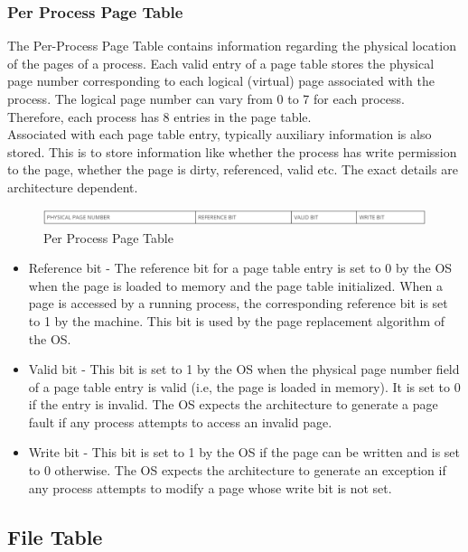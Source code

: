 \subsubsection {Per Process Page Table}

The Per-Process Page Table contains information regarding the physical location of the pages of a process. Each valid entry of a page table stores the physical page number corresponding to each logical (virtual) page associated with the process. The logical page number can vary from 0 to 7 for each process. Therefore, each process has 8 entries in the page table. 
\\
Associated with each page table entry, typically auxiliary information is also stored. This is to store information like whether the process has write permission to the page, whether the page is dirty, referenced, valid etc. The exact details are architecture dependent.
\\
\begin{figure}[ht]
\centering
\includegraphics  [scale=0.55]{figures/pgt.png}
\caption{\footnotesize Per Process Page Table}
\end{figure}

\begin {itemize}

\item Reference bit - The reference bit for a page table entry is set to 0 by the OS when the page is loaded to memory and the page table initialized. When a page is accessed by a running process, the corresponding reference bit is set to 1 by the machine. This bit is used by the page replacement algorithm of the OS.
\item Valid bit - This bit is set to 1 by the OS when the physical page number field of a page table entry is valid (i.e, the page is loaded in memory). It is set to 0 if the entry is invalid. The OS expects the architecture to generate a page fault if any process attempts to access an invalid page.
\item Write bit - This bit is set to 1 by the OS if the page can be written and is set to 0 otherwise. The OS expects the architecture to generate an exception if any process attempts to modify a page whose write bit is not set.
\end {itemize}

\subsection {File Table}

